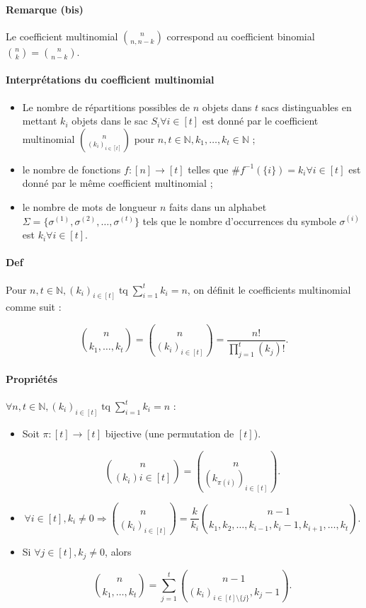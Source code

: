 \documentclass{article}
\DeclareMathOperator{\tq}{\text{ tq }}
\begin{document}
			\paragraph{Remarque (bis)} Le coefficient multinomial $\binom n{n, n-k}$ correspond au coefficient binomial $\binom nk = \binom n{n-k}$.

			\paragraph{Interprétations du coefficient multinomial}

			\begin{itemize}
				\item Le nombre de répartitions possibles de $n$ objets dans $t$ sacs distinguables en mettant $k_i$ objets dans le sac $S_i \forall i \in [t]$ est donné
				par le coefficient multinomial $\binom n{(k_i)_{i\in[t]}}$ pour $n, t \in \mathbb N, k_1, \ldots, k_t \in \mathbb N$ ;
				\item le nombre de fonctions $f : [n] \to [t]$ telles que $\#f^{-1}(\{i\}) = k_i \forall i \in [t]$ est donné par le même coefficient multinomial ;
				\item le nombre de mots de longueur $n$ faits dans un alphabet $\Sigma = \{\sigma^{(1)}, \sigma^{(2)}, \ldots, \sigma^{(t)}\}$ tels que
				le nombre d'occurrences du symbole $\sigma^{(i)}$ est $k_i \forall i \in [t]$.
			\end{itemize}

			\paragraph{Def} Pour $n, t \in \mathbb N, (k_i)_{i\in[t]} \tq \sum_{i=1}^tk_i=n$, on définit le coefficients multinomial comme suit :

			\[\binom {n}{k_1, \ldots, k_t} = \binom {n}{(k_i)_{i\in[t]}} = \frac {n!}{\prod_{j=1}^t(k_j)!}.\]

			\paragraph{Propriétés} $\forall n, t \in \mathbb N, (k_i)_{i\in[t]} \tq \sum_{i=1}^tk_i=n$ :

			\begin{itemize}
				\item Soit $\pi : [t] \to [t]$ bijective (une permutation de $[t]$).

				\[\binom {n}{(k_i){i\in[t]}} = \binom {n}{(k_{\pi(i)})_{i\in[t]}}.\]

				\item
				
				\[\forall i \in [t], k_i \neq 0 \Rightarrow \binom {n}{(k_i)_{i\in[t]}} = \frac k{k_i} \binom {n-1}{k_1, k_2, \ldots, k_{i-1}, k_i-1, k_{i+1}, \ldots, k_t}.\]

				\item Si $\forall j \in [t], k_j \neq 0$, alors

				\[\binom n{k_1, \ldots, k_t} = \sum_{j=1}^t\binom{n-1}{(k_i)_{i\in[t] \setminus \{j\}}, k_j-1}.\]
			\end{itemize}
\end{document}
